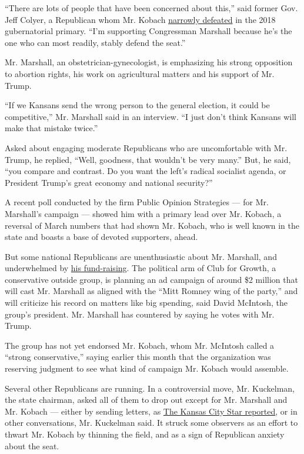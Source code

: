 ``There are lots of people that have been concerned about this,'' said
former Gov. Jeff Colyer, a Republican whom Mr. Kobach
\href{https://www.nytimes3xbfgragh.onion/2018/08/14/us/politics/kansas-kobach-colyer.html}{narrowly
defeated} in the 2018 gubernatorial primary. ``I'm supporting
Congressman Marshall because he's the one who can most readily, stably
defend the seat.''

Mr. Marshall, an obstetrician-gynecologist, is emphasizing his strong
opposition to abortion rights, his work on agricultural matters and his
support of Mr. Trump.

``If we Kansans send the wrong person to the general election, it could
be competitive,'' Mr. Marshall said in an interview. ``I just don't
think Kansans will make that mistake twice.''

Asked about engaging moderate Republicans who are uncomfortable with Mr.
Trump, he replied, ``Well, goodness, that wouldn't be very many.'' But,
he said, ``you compare and contrast. Do you want the left's radical
socialist agenda, or President Trump's great economy and national
security?''

A recent poll conducted by the firm Public Opinion Strategies --- for
Mr. Marshall's campaign --- showed him with a primary lead over Mr.
Kobach, a reversal of March numbers that had shown Mr. Kobach, who is
well known in the state and boasts a base of devoted supporters, ahead.

But some national Republicans are unenthusiastic about Mr. Marshall, and
underwhelmed by
\href{https://www.kansascity.com/news/politics-government/article242025641.html}{his
fund-raising}. The political arm of Club for Growth, a conservative
outside group, is planning an ad campaign of around \$2 million that
will cast Mr. Marshall as aligned with the ``Mitt Romney wing of the
party,'' and will criticize his record on matters like big spending,
said David McIntosh, the group's president. Mr. Marshall has countered
by saying he votes with Mr. Trump.

The group has not yet endorsed Mr. Kobach, whom Mr. McIntosh called a
``strong conservative,'' saying earlier this month that the organization
was reserving judgment to see what kind of campaign Mr. Kobach would
assemble.

Several other Republicans are running. In a controversial move, Mr.
Kuckelman, the state chairman, asked all of them to drop out except for
Mr. Marshall and Mr. Kobach --- either by sending letters, as
\href{https://www.kansascity.com/news/politics-government/article242232001.html}{The
Kansas City Star reported}, or in other conversations, Mr. Kuckelman
said. It struck some observers as an effort to thwart Mr. Kobach by
thinning the field, and as a sign of Republican anxiety about the seat.

